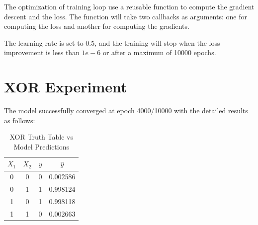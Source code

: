 \documentclass{article}
\begin{document}
The optimization of training loop use a reusable function to compute the gradient descent and the loss. 
The function will take two callbacks as arguments: one for computing the loss and another for computing the gradients.

The learning rate is set to 0.5, and the training will stop when the loss improvement is less than \(1e-6\) or after a maximum of 10000 epochs.
\section*{XOR Experiment}
The model successfully converged at epoch 4000/10000 with the detailed results as follows:

\begin{table}[H]
\centering
\caption{XOR Truth Table vs Model Predictions}
\vspace{0.2cm}
\begin{tabular}{cccc}
\toprule
\textbf{$X_1$} & \textbf{$X_2$} & \textbf{$y$} & \textbf{$\hat{y}$} \\
\midrule
0 & 0 & 0 & 0.002586 \\
0 & 1 & 1 & 0.998124 \\
1 & 0 & 1 & 0.998118 \\
1 & 1 & 0 & 0.002663 \\
\bottomrule
\end{tabular}
\end{table}
\end{document}
